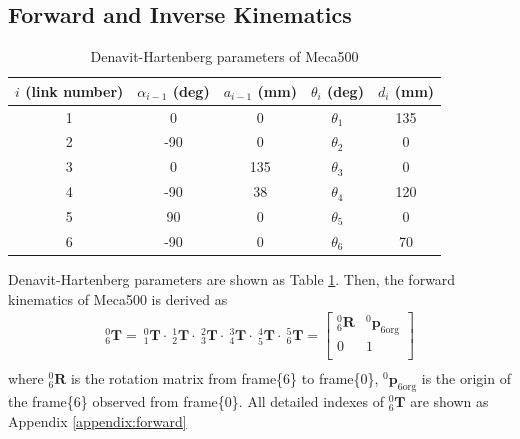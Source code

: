 \subsection{Forward and Inverse Kinematics}
\label{sec:forward}
\begin{table}[htbp]
\centering
\caption{Denavit-Hartenberg parameters of Meca500}
\label{tab:DHtable}
\begin{tabular}{ccccc} 
\hline \hline
$i$ (link number)		&$\alpha _{i-1}$ (deg)	&$a_{i-1}$ (mm)	& $\theta _i$ (deg)			&$d_i$ (mm)	\\\hline
1   					&0    					&0				&$\theta _1$				&135 \\
2   					&-90   					&0				&$\theta _2$				&0 \\
3  						&0    					&135			&$\theta _3$ 				&0 \\
4   					&-90    				&38				&$\theta _4$ 				&120 \\
5   					&90   					&0				&$\theta _5$ 				&0 \\
6						&-90  					&0				&$\theta _6$ 				&70 \\
\end{tabular}
\end{table}
Denavit-Hartenberg parameters are shown as Table \ref{tab:DHtable}. Then, the forward kinematics of Meca500 is derived as
\begin{equation}
\begin{split}
^0_6\mathbf{T} =
\ ^0_1\mathbf{T} \cdot \ ^1_2\mathbf{T} \cdot \ ^2_3\mathbf{T} \cdot \ ^3_4\mathbf{T} \cdot \ ^4_5\mathbf{T} \cdot \ ^5_6\mathbf{T} =
\begin{bmatrix}
^0_6\mathbf{R}	&^0\boldsymbol{p}_\mathrm{6org}\\
0				&1\\
\end{bmatrix}\\
\end{split}
\end{equation}\label{eq:translation matrix}
where $^0_6\mathbf{R}$ is the rotation matrix from frame\{6\} to frame\{0\}, $^0\boldsymbol{p}_\mathrm{6org}$ is the origin of the frame\{6\} observed from frame\{0\}. All detailed indexes of $^0_6\mathbf{T}$ are shown as Appendix \ref{appendix:forward}

